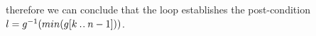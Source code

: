 \documentclass[11pt,a4paper,fleqn]{article}
\begin{document}
therefore we can conclude that the loop establishes the post-condition $  l = g^{-1}(min(g[k \mathbin{.\mkern1mu.} n-1])) $.\\    








\end{document}
